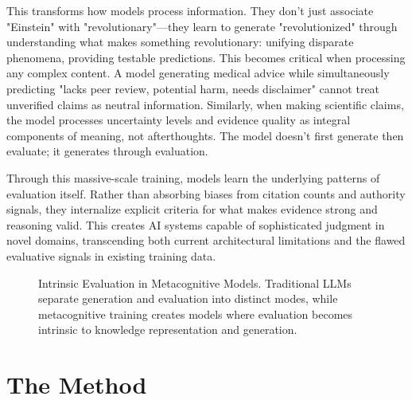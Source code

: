\documentclass[11pt]{article}
\begin{document}
	This transforms how models process information. They don't just associate "Einstein" with "revolutionary"—they learn to generate "revolutionized" through understanding what makes something revolutionary: unifying disparate phenomena, providing testable predictions. This becomes critical when processing any complex content. A model generating medical advice while simultaneously predicting "lacks peer review, potential harm, needs disclaimer" cannot treat unverified claims as neutral information. Similarly, when making scientific claims, the model processes uncertainty levels and evidence quality as integral components of meaning, not afterthoughts. The model doesn't first generate then evaluate; it generates through evaluation.
	
	Through this massive-scale training, models learn the underlying patterns of evaluation itself. Rather than absorbing biases from citation counts and authority signals, they internalize explicit criteria for what makes evidence strong and reasoning valid. This creates AI systems capable of sophisticated judgment in novel domains, transcending both current architectural limitations and the flawed evaluative signals in existing training data.
	
	\begin{figure}[h]
		\centering
		
		\caption{Intrinsic Evaluation in Metacognitive Models. Traditional LLMs separate generation and evaluation into distinct modes, while metacognitive training creates models where evaluation becomes intrinsic to knowledge representation and generation.}
		\label{fig:intrinsic-evaluation}
	\end{figure}
	
	\section{The Method}
	
\end{document}
